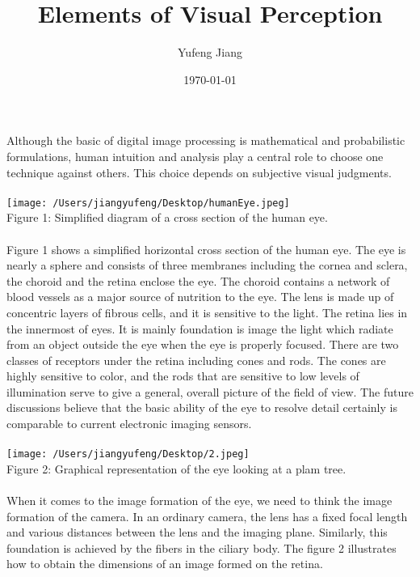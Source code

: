 \documentclass[11pt,oneside]{article}
\title{Elements of Visual Perception}
\author{Yufeng Jiang}
\date{\today}
\begin{document}
\maketitle
Although the basic of digital image processing is mathematical and probabilistic formulations, human intuition and analysis play a central role to choose one technique against others. This choice depends on subjective visual judgments.\\
\\
\texttt{[image: /Users/jiangyufeng/Desktop/humanEye.jpeg]}\\
Figure 1: Simplified diagram of a cross section of the human eye.\\
\\
\indent Figure 1 shows a simplified horizontal cross section of the human eye. The eye is nearly a sphere and consists of three membranes including the cornea and sclera, the choroid and the retina enclose the eye. The choroid contains a network of blood vessels as a major source of nutrition to the eye. The lens is made up of concentric layers of fibrous cells, and it is sensitive to the light. The retina lies in the innermost of eyes. It is mainly foundation is image the light which radiate from an object outside the eye when the eye is properly focused. There are two classes of receptors under the retina including cones and rods. The cones are highly sensitive to color, and the rods that are sensitive to low levels of illumination serve to give a general, overall picture of the field of view. The future discussions believe that the basic ability of the eye to resolve detail certainly is comparable to current electronic imaging sensors.\\
\\
\texttt{[image: /Users/jiangyufeng/Desktop/2.jpeg]}\\
Figure 2: Graphical representation of the eye looking at a plam tree.\\
\\
\indent When it comes to the image formation of the eye, we need to think the image formation of the camera. In an ordinary camera, the lens has a fixed focal length and various distances between the lens and the imaging plane. Similarly, this foundation is achieved by the fibers in the ciliary body. The figure 2 illustrates how to obtain the dimensions of an image formed on the retina. 
\end{document}
